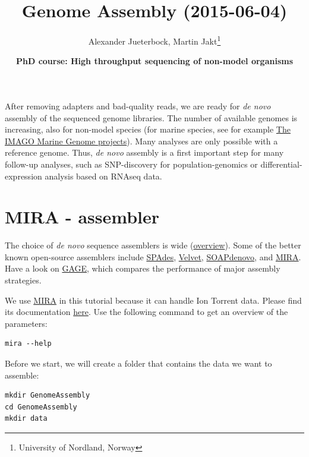 \documentclass[11pt]{article}
\author{Alexander Jueterbock, Martin Jakt\thanks{University of Nordland, Norway}}
\date{\textbf{PhD course: High throughput sequencing of non-model organisms}}
\title{\textbf{Genome Assembly} (2015-06-04)}
\begin{document}
\maketitle
\tableofcontents








After removing adapters and bad-quality reads, we are ready for \emph{de
novo} assembly of the sequenced genome libraries. The number of
available genomes is increasing, also for non-model species (for
marine species, see for example \href{http://cemeb.science.gu.se/research/imago-marine-genome-projects}{The IMAGO Marine Genome
projects}). Many analyses are only possible with a reference 
genome. Thus, \emph{de novo} assembly is a first important step for many
follow-up analyses, such as SNP-discovery for population-genomics or
differential-expression analysis based on RNAseq data.

\section{MIRA - assembler}
\label{sec-1}
The choice of \emph{de novo} sequence assemblers is wide (\href{http://en.wikibooks.org/wiki/Next_Generation_Sequencing_\%28NGS\%29/De_novo_assembly#Creating_a_dataset}{overview}). Some
of the better known open-source assemblers include \href{http://bioinf.spbau.ru/spades}{SPAdes}, \href{http://www.ebi.ac.uk/~zerbino/velvet/}{Velvet},
\href{http://soap.genomics.org.cn/soapdenovo.html}{SOAPdenovo}, and \href{http://sourceforge.net/projects/mira-assembler/}{MIRA}. Have a look on \href{http://gage.cbcb.umd.edu/index.html}{GAGE}, which compares the
performance of major assembly strategies.

We use \href{http://sourceforge.net/projects/mira-assembler/}{MIRA} in this tutorial because it can handle Ion Torrent
data. Please find its documentation \href{http://mira-assembler.sourceforge.net/docs/DefinitiveGuideToMIRA.pdf}{here}. Use the following command to
get an overview of the parameters: 

\begin{verbatim}
mira --help
\end{verbatim}

Before we start, we will create a folder that contains the data we
want to assemble:

\begin{verbatim}
mkdir GenomeAssembly
cd GenomeAssembly
mkdir data
\end{verbatim}
\end{document}
